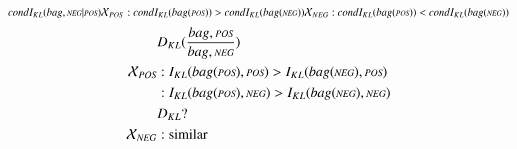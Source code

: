 \noindent$
condI_{KL}(bag,\cneg|\cpos) \\
\mathcal{X}_{POS} : condI_{KL} (bag(\cpos)) > condI_{KL} (bag(\cneg))\\
\mathcal{X}_{NEG} : condI_{KL} (bag(\cpos)) < condI_{KL} (bag(\cneg))\\
$
\begin{align}
& D_{KL}(\frac{bag,\cpos}{bag,\cneg})\\
\mathcal{X}_{\cpos} & : I_{KL}(bag(\cpos),\cpos) > I_{KL}(bag(\cneg),\cpos) \\
& : I_{KL}(bag(\cpos),\cneg) > I_{KL}(bag(\cneg),\cneg) \\
& D_{KL} ? \\
\mathcal{X}_{\cneg} & : \text{similar} 
\end{align}